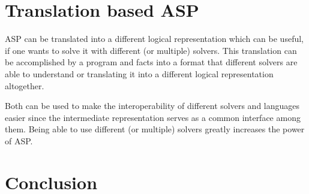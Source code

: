 \documentclass[runningheads]{llncs}
\begin{document}
\begin{comment}
\subsection{other things}

Explains details about syntax

Syntax and semantic of the language is explained by example of the seating problem. By providing the code that is solving an instance of this problem and then giving the intuitive meaning of the code to the reader. Other example is locking design. How to define defaults (Exit of house is room 1). How to define recursion: Rooms are reachable indirectly. Also given an example of how to search for the minimal number of doors needed: Set a limit of doors available and increase this limit over time. 

Example also shows that ASP can be used for computationally difficult problems. Janhunen and Niemelä show that the locking design problem is NP-Complete\footnote{NP-complete is a subset of NP and the intersection of NP and NP-hard. It represents a set of problems to which all problems in NP can be reduced to in polynomial time using a deterministic Turing machine.}. This is by reducing Exact-3-SAT, an NP-problem, to ldp in polynomial time. 
\end{comment}






\section{Translation based ASP} \label{sec:translation}

ASP can be translated into a different logical representation which can be useful, if one wants to solve it with different (or multiple) solvers. This translation can be accomplished by   a program and facts into a format that different solvers are able to understand or  translating it into a different logical representation altogether.

Both can be used to make the interoperability of different solvers and languages easier since the intermediate representation serves as a  common interface among them. Being able to use different (or multiple) solvers greatly increases the power of ASP. 

\section{Conclusion}
\end{document}
